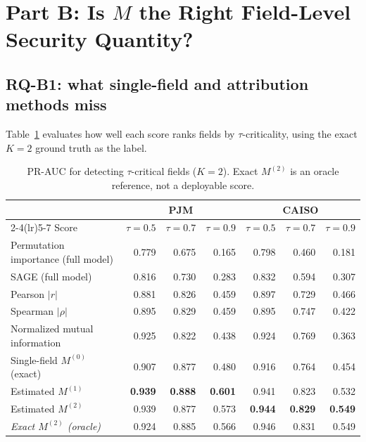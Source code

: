 \documentclass[preprint,12pt]{elsarticle}
\begin{document}
\section{Part B: Is $M$ the Right Field-Level Security Quantity?}\label{sec:exp-b}

\subsection{RQ-B1: what single-field and attribution methods miss}
Table~\ref{tab:detect} evaluates how well each score ranks fields by $\tau$-criticality,
using the exact $K=2$ ground truth as the label.

\begin{table}[t]
\centering
\caption{PR-AUC for detecting $\tau$-critical fields ($K=2$). Exact $M^{(2)}$ is an oracle
reference, not a deployable score.}
\label{tab:detect}
\small
\begin{tabular}{lrrrrrr}
\toprule
& \multicolumn{3}{c}{PJM} & \multicolumn{3}{c}{CAISO} \\
\cmidrule(lr){2-4}\cmidrule(lr){5-7}
Score & $\tau{=}0.5$ & $\tau{=}0.7$ & $\tau{=}0.9$ & $\tau{=}0.5$ & $\tau{=}0.7$ & $\tau{=}0.9$ \\
\midrule
Permutation importance (full model) & 0.779 & 0.675 & 0.165 & 0.798 & 0.460 & 0.181 \\
SAGE (full model)                   & 0.816 & 0.730 & 0.283 & 0.832 & 0.594 & 0.307 \\
Pearson $|r|$                       & 0.881 & 0.826 & 0.459 & 0.897 & 0.729 & 0.466 \\
Spearman $|\rho|$                   & 0.895 & 0.829 & 0.459 & 0.895 & 0.747 & 0.422 \\
Normalized mutual information       & 0.925 & 0.822 & 0.438 & 0.924 & 0.769 & 0.363 \\
Single-field $M^{(0)}$ (exact)      & 0.907 & 0.877 & 0.480 & 0.916 & 0.764 & 0.454 \\
Estimated $M^{(1)}$                 & \textbf{0.939} & \textbf{0.888} & \textbf{0.601} & 0.941 & 0.823 & 0.532 \\
Estimated $M^{(2)}$                 & 0.939 & 0.877 & 0.573 & \textbf{0.944} & \textbf{0.829} & \textbf{0.549} \\
\midrule
\emph{Exact $M^{(2)}$ (oracle)}     & 0.924 & 0.885 & 0.566 & 0.946 & 0.831 & 0.549 \\
\bottomrule
\end{tabular}
\end{table}
\end{document}
